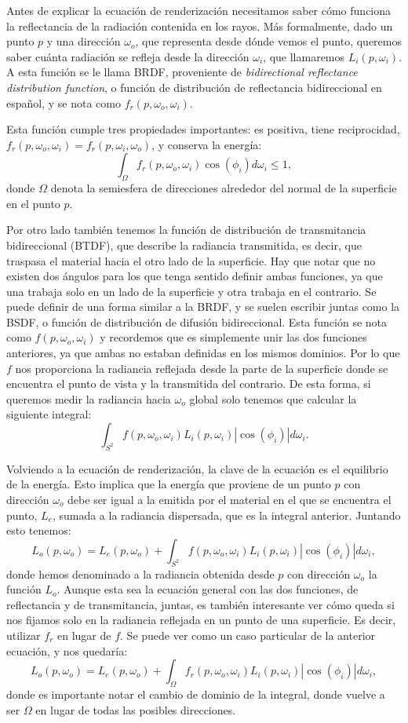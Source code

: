 \documentclass{scrbook}
\begin{document}
Antes de explicar la ecuación de renderización necesitamos saber cómo funciona la reflectancia de la radiación contenida en los rayos. Más formalmente, dado un punto $p$ y una dirección $\omega_o$, que representa desde dónde vemos el punto, queremos saber cuánta radiación se refleja desde la dirección $\omega_i$, que llamaremos $L_i(p, \omega_i)$. A esta función se le llama BRDF, proveniente de \textit{bidirectional reflectance distribution function}, o función de distribución de reflectancia bidireccional en español, y se nota como $f_r(p, \omega_o, \omega_i)$. 

Esta función cumple tres propiedades importantes: es positiva, tiene reciprocidad, $f_r(p, \omega_o, \omega_i) = f_r(p, \omega_i, \omega_o)$, y conserva la energía:
$$\int_{\Omega } f_r(p, \omega_o, \omega_i) \cos(\phi_i) d\omega_i \leq 1,$$
donde $\Omega$ denota la semiesfera de direcciones alrededor del normal de la superficie en el punto $p$.

Por otro lado también tenemos la función de distribución de transmitancia bidireccional (BTDF), que describe la radiancia transmitida, es decir, que traspasa el material hacia el otro lado de la superficie. Hay que notar que no existen dos ángulos para los que tenga sentido definir ambas funciones, ya que una trabaja solo en un lado de la superficie y otra trabaja en el contrario. Se puede definir de una forma similar a la BRDF, y se suelen escribir juntas como la BSDF, o función de distribución de difusión bidireccional. Esta función se nota como $f(p, \omega_o, \omega_i)$ y recordemos que es simplemente unir las dos funciones anteriores, ya que ambas no estaban definidas en los mismos dominios. Por lo que $f$ nos proporciona la radiancia reflejada desde la parte de la superficie donde se encuentra el punto de vista y la transmitida del contrario. De esta forma, si queremos medir la radiancia hacia $\omega_o$ global solo tenemos que calcular la siguiente integral:
$$ \int_{S^2} f(p, \omega_o, \omega_i) L_i(p, \omega_i) |\cos(\phi_i)| d\omega_i.$$

Volviendo a la ecuación de renderización, la clave de la ecuación es el equilibrio de la energía. Esto implica que la energía que proviene de un punto $p$ con dirección $\omega_o$ debe ser igual a la emitida por el material en el que se encuentra el punto, $L_e$, sumada a la radiancia dispersada, que es la integral anterior. Juntando esto tenemos:
$$L_o(p, \omega_o) = L_e(p, \omega_o) + \int_{S^2} f(p, \omega_o, \omega_i) L_i(p, \omega_i) |\cos(\phi_i)| d\omega_i,$$
donde hemos denominado a la radiancia obtenida desde $p$ con dirección $\omega_o$ la función $L_o$. Aunque esta sea la ecuación general con las dos funciones, de reflectancia y de transmitancia, juntas, es también interesante ver cómo queda si nos fijamos solo en la radiancia reflejada en un punto de una superficie. Es decir, utilizar $f_r$ en lugar de $f$. Se puede ver como un caso particular de la anterior ecuación, y nos quedaría:
$$L_o(p, \omega_o) = L_e(p, \omega_o) + \int_{\Omega} f_r(p, \omega_o, \omega_i) L_i(p, \omega_i) |\cos(\phi_i)| d\omega_i,$$
donde es importante notar el cambio de dominio de la integral, donde vuelve a ser $\Omega$ en lugar de todas las posibles direcciones.
\end{document}
